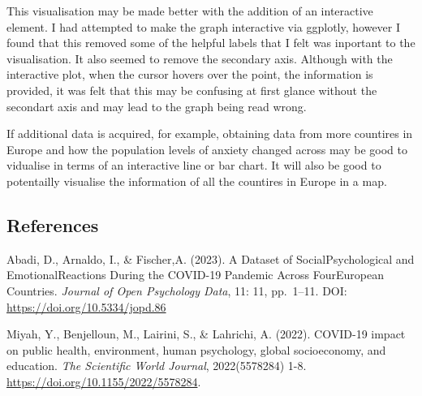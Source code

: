\documentclass[
]{article}
\begin{document}
This visualisation may be made better with the addition of an
interactive element. I had attempted to make the graph interactive via
ggplotly, however I found that this removed some of the helpful labels
that I felt was inportant to the visualisation. It also seemed to remove
the secondary axis. Although with the interactive plot, when the cursor
hovers over the point, the information is provided, it was felt that
this may be confusing at first glance without the secondart axis and may
lead to the graph being read wrong.

If additional data is acquired, for example, obtaining data from more
countires in Europe and how the population levels of anxiety changed
across may be good to vidualise in terms of an interactive line or bar
chart. It will also be good to potentailly visualise the information of
all the countires in Europe in a map.

\subsection{References}\label{references}

Abadi, D., Arnaldo, I., \& Fischer,A. (2023). A Dataset of
SocialPsychological and EmotionalReactions During the COVID-19 Pandemic
Across FourEuropean Countries. \emph{Journal of Open Psychology Data},
11: 11, pp.~1--11. DOI: \url{https://doi.org/10.5334/jopd.86}

Miyah, Y., Benjelloun, M., Lairini, S., \& Lahrichi, A. (2022). COVID-19
impact on public health, environment, human psychology, global
socioeconomy, and education. \emph{The Scientific World Journal},
2022(5578284) 1-8. \url{https://doi.org/10.1155/2022/5578284}.
\end{document}
